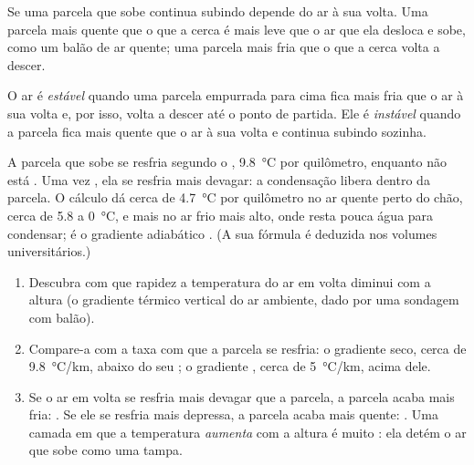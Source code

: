 Se uma parcela que sobe continua subindo depende do ar à sua volta. Uma
parcela mais quente que o que a cerca é mais leve que o ar que ela desloca
e sobe, como um balão de ar quente; uma parcela mais fria que o que a cerca
volta a descer.

\begin{definition}\label{def:g10:why-clouds-form:stability}
O ar é \emph{estável} quando uma parcela
empurrada para cima fica mais fria que o ar à sua volta e, por isso, volta a
descer até o ponto de partida. Ele é \emph{instável}
quando a parcela fica mais quente que o ar à sua volta e continua subindo
sozinha.
\end{definition}

A parcela que sobe se resfria segundo o ,
\qty{9.8}{\degreeCelsius} por quilômetro, enquanto não está . Uma vez
, ela se resfria mais devagar: a condensação libera 
dentro da parcela. O cálculo dá cerca de \qty{4.7}{\degreeCelsius} por
quilômetro no ar quente perto do chão, cerca de \num{5.8} a
\qty{0}{\degreeCelsius}, e mais no ar frio mais alto, onde resta pouca água
para condensar; é o gradiente adiabático . (A sua fórmula é
deduzida nos volumes universitários.)

\begin{method}\label{met:g10:why-clouds-form:stable}
\begin{enumerate}
  \item Descubra com que rapidez a temperatura do ar em volta diminui com a
        altura (o gradiente térmico vertical do ar ambiente, dado por uma
        sondagem com balão).
  \item Compare-a com a taxa com que a parcela se resfria: o gradiente
        seco, cerca de \qty{9.8}{\degreeCelsius/km}, abaixo do seu ; o gradiente , cerca de
        \qty{5}{\degreeCelsius/km}, acima dele.
  \item Se o ar em volta se resfria mais devagar que a parcela, a parcela
        acaba mais fria: . Se ele se resfria mais depressa, a parcela
        acaba mais quente: . Uma camada em que a temperatura
        \emph{aumenta} com a altura é muito : ela detém o ar que
        sobe como uma tampa.
\end{enumerate}
\end{method}

